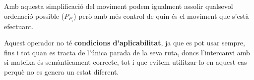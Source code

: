 Amb aquesta simplificació del moviment podem igualment assolir qualsevol ordenació possible ($P_{P_i}$) però amb més control de quin és el moviment que s'està efectuant.

Aquest operador no té \textbf{condicions d'aplicabilitat}, ja que es pot usar sempre, fins i tot quan es tracta de l'única parada de la seva ruta, doncs l'intercanvi amb si mateixa és semànticament correcte, tot i que evitem utilitzar-lo en aquest cas perquè no es genera un estat diferent.


